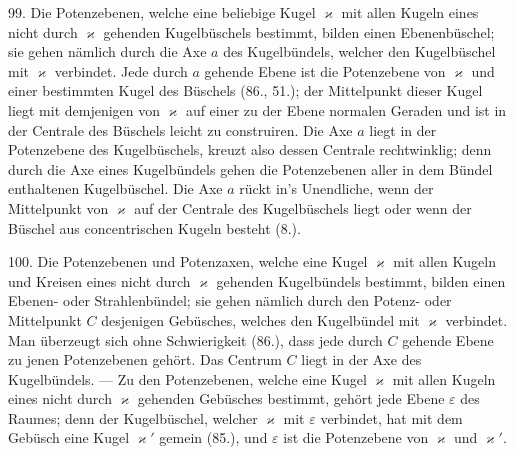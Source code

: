 \begin{center}
\makebox[15em]{\hrulefill}
\end{center}


\label{p11}


\hspace{\parindent}%
99. Die Potenzebenen, welche eine beliebige Kugel $\varkappa$
mit allen Kugeln eines nicht durch $\varkappa$ gehenden Kugelb\"uschels
bestimmt, bilden einen Ebenenb\"uschel; sie gehen n\"amlich
durch die Axe $a$ des Kugelb\"undels, welcher den Kugelb\"uschel
mit $\varkappa$ verbindet. Jede durch $a$ gehende Ebene ist die Potenzebene
von $\varkappa$ und einer bestimmten Kugel des B\"uschels
(86., 51.); der Mittelpunkt dieser Kugel liegt mit demjenigen
von $\varkappa$ auf einer zu der Ebene normalen Geraden und ist in
der Centrale des B\"uschels leicht zu construiren. Die Axe $a$
liegt in der Potenzebene des Kugelb\"uschels, kreuzt also dessen
Centrale rechtwinklig; denn durch die Axe eines Kugelb\"undels
gehen die Potenzebenen aller in dem B\"undel enthaltenen
Kugelb\"uschel. Die Axe $a$ r\"uckt in's Unendliche,
wenn der Mittelpunkt von $\varkappa$ auf der Centrale des Kugelb\"uschels
liegt oder wenn der B\"uschel aus concentrischen
Kugeln besteht (8.).

100. Die Potenzebenen und Potenzaxen, welche eine
Kugel $\varkappa$ mit allen Kugeln und Kreisen eines nicht durch $\varkappa$
gehenden Kugelb\"undels bestimmt, bilden einen Ebenen- oder
Strahlenb\"undel; sie gehen n\"amlich durch den Potenz- oder
Mittelpunkt $C$ desjenigen Geb\"usches, welches den Kugelb\"undel
mit $\varkappa$ verbindet. Man \"uberzeugt sich ohne Schwierigkeit
(86.), dass jede durch $C$ gehende Ebene zu jenen Potenzebenen
geh\"ort. Das Centrum $C$ liegt in der Axe des
Kugelb\"undels. --- Zu den Potenzebenen, welche eine Kugel
$\varkappa$ mit allen Kugeln eines nicht durch $\varkappa$ gehenden Geb\"usches
bestimmt, geh\"ort jede Ebene $\varepsilon$ des Raumes; denn der Kugelb\"uschel,
welcher $\varkappa$ mit $\varepsilon$ verbindet, hat mit dem Geb\"usch
eine Kugel $\varkappa'$ gemein (85.), und $\varepsilon$ ist die Potenzebene von
$\varkappa$ und $\varkappa'$.

